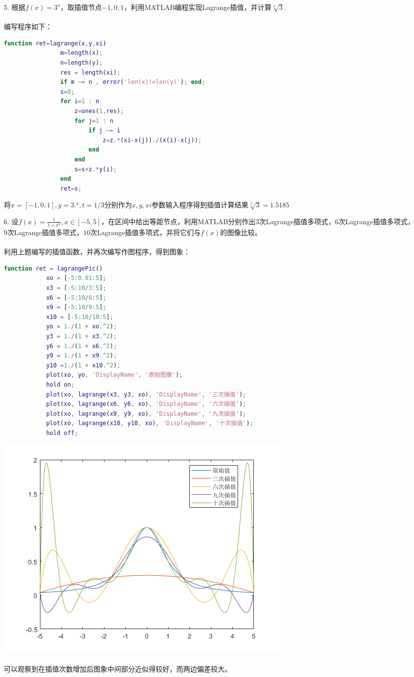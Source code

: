 \documentclass{article}
\begin{document}
\begin{itemize}
		\item[5.]根据$f(x)=3^{x}$，取插值节点$-1,0,1$，利用MATLAB编程实现Lagrange插值，并计算$\sqrt[3]{3}$.\\\\
		编写程序如下：\\
			\begin{lstlisting}[language= MATLAB] 
				function ret=lagrange(x,y,xi)
				m=length(x);
				n=length(y);
				res = length(xi);
				if m ~= n , error('len(x)!=len(y)'); end;
				s=0;
				for i=1 : n
					z=ones(1,res);
					for j=1 : n
						if j ~= i
							z=z.*(xi-x(j))./(x(i)-x(j));
						end
					end
					s=s+z.*y(i);
				end
				ret=s;
			\end{lstlisting}
		将$x = [-1, 0, 1], y = 3.^x, t = 1/3$分别作为$x, y, xi$参数输入程序得到插值计算结果$\sqrt[3]{3} = 1.5185$\\
		\item[6.]设$f(x) = \frac{1}{1 + x^{2}},x \in [-5,5]$，在区间中给出等距节点，利用MATLAB分别作出$3$次Lagrange插值多项式，$6$次Lagrange插值多项式，$9$次Lagrange插值多项式，$10$次Lagrange插值多项式，并将它们与$f(x)$的图像比较。\\\\
		利用上题编写的插值函数，并再次编写作图程序，得到图象：\\
		\begin{lstlisting}[language = MATLAB]
			function ret = lagrangePic()
			xo = [-5:0.01:5];
			x3 = [-5:10/3:5];
			x6 = [-5:10/6:5];
			x9 = [-5:10/9:5];
			x10 = [-5:10/10:5];
			yo = 1./(1 + xo.^2);
			y3 = 1./(1 + x3.^2);
			y6 = 1./(1 + x6.^2);
			y9 = 1./(1 + x9.^2);
			y10 =1./(1 + x10.^2);
			plot(xo, yo, 'DisplayName', '原始图像');
			hold on;
			plot(xo, lagrange(x3, y3, xo), 'DisplayName', '三次插值');
			plot(xo, lagrange(x6, y6, xo), 'DisplayName', '六次插值');
			plot(xo, lagrange(x9, y9, xo), 'DisplayName', '九次插值');
			plot(xo, lagrange(x10, y10, xo), 'DisplayName', '十次插值');
			hold off;
		\end{lstlisting}
		\includegraphics[scale=1]{Lagrange.png}\\\\
		可以观察到在插值次数增加后图象中间部分近似得较好，而两边偏差较大。
	\end{itemize}
\end{document}
